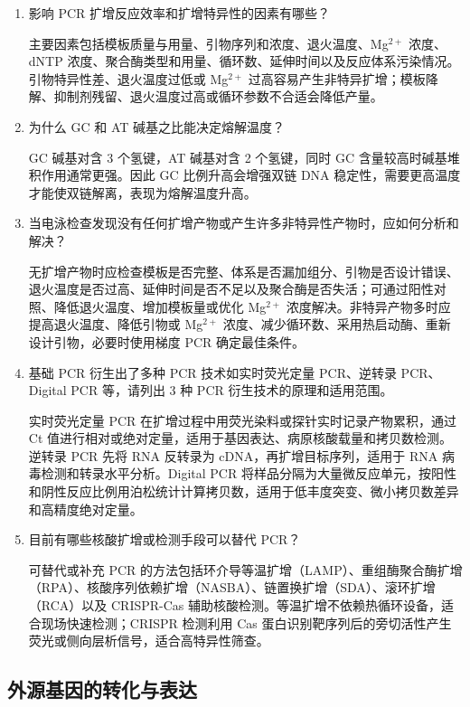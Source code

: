 \documentclass[a4paper]{article}
\begin{document}
\begin{enumerate}[label=\arabic*.]
	\item 影响 PCR 扩增反应效率和扩增特异性的因素有哪些？

	主要因素包括模板质量与用量、引物序列和浓度、退火温度、Mg$^{2+}$ 浓度、dNTP 浓度、聚合酶类型和用量、循环数、延伸时间以及反应体系污染情况。引物特异性差、退火温度过低或 Mg$^{2+}$ 过高容易产生非特异扩增；模板降解、抑制剂残留、退火温度过高或循环参数不合适会降低产量。

	\item 为什么 GC 和 AT 碱基之比能决定熔解温度？

	GC 碱基对含 3 个氢键，AT 碱基对含 2 个氢键，同时 GC 含量较高时碱基堆积作用通常更强。因此 GC 比例升高会增强双链 DNA 稳定性，需要更高温度才能使双链解离，表现为熔解温度升高。

	\item 当电泳检查发现没有任何扩增产物或产生许多非特异性产物时，应如何分析和解决？

	无扩增产物时应检查模板是否完整、体系是否漏加组分、引物是否设计错误、退火温度是否过高、延伸时间是否不足以及聚合酶是否失活；可通过阳性对照、降低退火温度、增加模板量或优化 Mg$^{2+}$ 浓度解决。非特异产物多时应提高退火温度、降低引物或 Mg$^{2+}$ 浓度、减少循环数、采用热启动酶、重新设计引物，必要时使用梯度 PCR 确定最佳条件。

	\item 基础 PCR 衍生出了多种 PCR 技术如实时荧光定量 PCR、逆转录 PCR、Digital PCR 等，请列出 3 种 PCR 衍生技术的原理和适用范围。

	实时荧光定量 PCR 在扩增过程中用荧光染料或探针实时记录产物累积，通过 Ct 值进行相对或绝对定量，适用于基因表达、病原核酸载量和拷贝数检测。逆转录 PCR 先将 RNA 反转录为 cDNA，再扩增目标序列，适用于 RNA 病毒检测和转录水平分析。Digital PCR 将样品分隔为大量微反应单元，按阳性和阴性反应比例用泊松统计计算拷贝数，适用于低丰度突变、微小拷贝数差异和高精度绝对定量。

	\item 目前有哪些核酸扩增或检测手段可以替代 PCR？

	可替代或补充 PCR 的方法包括环介导等温扩增（LAMP）、重组酶聚合酶扩增（RPA）、核酸序列依赖扩增（NASBA）、链置换扩增（SDA）、滚环扩增（RCA）以及 CRISPR-Cas 辅助核酸检测。等温扩增不依赖热循环设备，适合现场快速检测；CRISPR 检测利用 Cas 蛋白识别靶序列后的旁切活性产生荧光或侧向层析信号，适合高特异性筛查。
\end{enumerate}

\subsection{外源基因的转化与表达}
\end{document}
